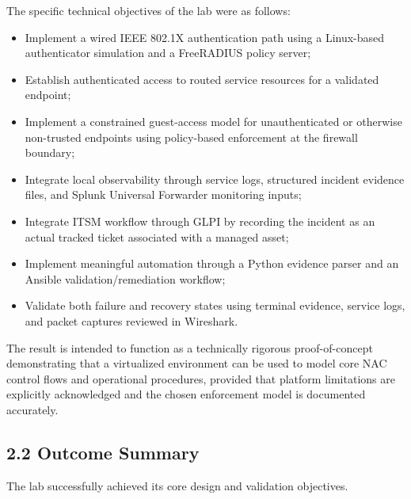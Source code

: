 \documentclass[11pt]{article}
\begin{document}
The specific technical objectives of the lab were as follows:

\begin{itemize}
    \item Implement a wired IEEE 802.1X authentication path using a Linux-based authenticator simulation and a FreeRADIUS policy server;
    \item Establish authenticated access to routed service resources for a validated endpoint;
    \item Implement a constrained guest-access model for unauthenticated or otherwise non-trusted endpoints using policy-based enforcement at the firewall boundary;
    \item Integrate local observability through service logs, structured incident evidence files, and Splunk Universal Forwarder monitoring inputs;
    \item Integrate ITSM workflow through GLPI by recording the incident as an actual tracked ticket associated with a managed asset;
    \item Implement meaningful automation through a Python evidence parser and an Ansible validation/remediation workflow;
    \item Validate both failure and recovery states using terminal evidence, service logs, and packet captures reviewed in Wireshark.
\end{itemize}

The result is intended to function as a technically rigorous proof-of-concept demonstrating that a virtualized environment can be used to model core NAC control flows and operational procedures, provided that platform limitations are explicitly acknowledged and the chosen enforcement model is documented accurately.


\subsection{2.2 Outcome Summary}
\label{sec:outcome-summary}

The lab successfully achieved its core design and validation objectives.
\end{document}
